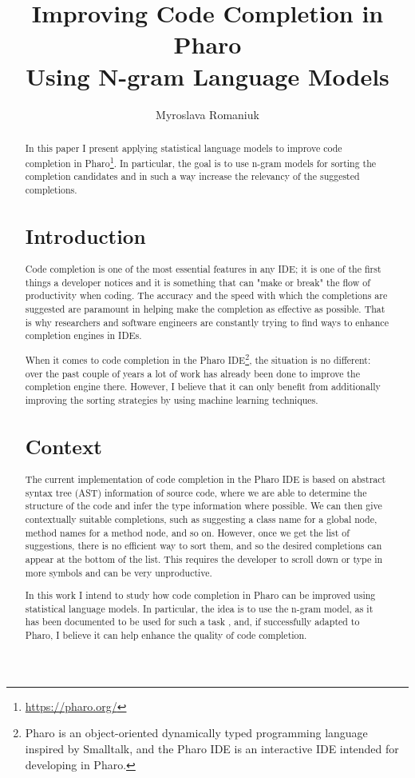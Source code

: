 \documentclass[sigconf,screen]{acmart}
\title{Improving Code Completion in Pharo\\Using N-gram Language Models}
\author{Myroslava Romaniuk}
\affiliation{\institution{Ukrainian Catholic University}}
\begin{document}
\begin{abstract}
In this paper I present applying statistical language models to improve code completion in Pharo\footnote{\url{https://pharo.org/}}. In particular, the goal is to use n-gram models for sorting the completion candidates and in such a way increase the relevancy of the suggested completions.

\section{Introduction}
Code completion is one of the most essential features in any IDE; it is one of the first things a developer notices and it is something that can "make or break" the flow of productivity when coding. The accuracy and the speed with which the completions are suggested are paramount in helping make the completion as effective as possible. That is why researchers and software engineers are constantly trying to find ways to enhance completion engines in IDEs.

When it comes to code completion in the Pharo IDE\footnote{Pharo is an object-oriented dynamically typed programming language inspired by Smalltalk, and the Pharo IDE is an interactive IDE intended for developing in Pharo.}, the situation is no different: over the past couple of years a lot of work has already been done to improve the completion engine there. However, I believe that it can only benefit from additionally improving the sorting strategies by using machine learning techniques.

\section{Context}
The current implementation of code completion in the Pharo IDE is based on abstract syntax tree (AST) information of source code, where we are able to determine the structure of the code and infer the type information where possible. We can then give contextually suitable completions, such as suggesting a class name for a global node, method names for a method node, and so on. However, once we get the list of suggestions, there is no efficient way to sort them, and so the desired completions can appear at the bottom of the list. This requires the developer to scroll down or type in more symbols and can be very unproductive.

In this work I intend to study how code completion in Pharo can be improved using statistical language models. In particular, the idea is to use the n-gram model, as it has been documented to be used for such a task \cite{Hind12a}, and, if successfully adapted to Pharo, I believe it can help enhance the quality of code completion.


\end{abstract}
\end{document}
